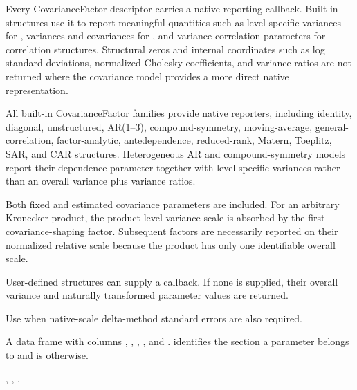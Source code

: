 \documentclass[a4paper]{book}
\begin{document}
\begin{Details}\relax
Every CovarianceFactor descriptor carries a native reporting callback. Built-in
structures use it to report meaningful quantities such as level-specific
variances for , variances and covariances for , and
variance-correlation parameters for correlation structures. Structural zeros
and internal coordinates such as log standard deviations, normalized Cholesky
coefficients, and variance ratios are not returned where the covariance model
provides a more direct native representation.

All built-in CovarianceFactor families provide native reporters, including
identity, diagonal, unstructured, AR(1--3), compound-symmetry, moving-average,
general-correlation, factor-analytic, antedependence, reduced-rank, Matern,
Toeplitz, SAR, and CAR structures. Heterogeneous AR and compound-symmetry
models report their dependence parameter together with level-specific
variances rather than an overall variance plus variance ratios.

Both fixed and estimated covariance parameters are included. For an arbitrary
Kronecker product, the product-level variance scale is absorbed by the first
covariance-shaping factor. Subsequent factors are necessarily reported on their
normalized relative scale because the product has only one identifiable overall
scale.

User-defined  structures can supply a 
callback. If none is supplied, their overall variance and naturally transformed
parameter values are returned.

Use  when native-scale delta-method standard errors
are also required.
\end{Details}
%
\begin{Value}
A data frame with columns , , ,
, and .  identifies the
 section a parameter belongs to and is  otherwise.
\end{Value}
%
\begin{SeeAlso}\relax
{}, , ,
\end{SeeAlso}
%
\begin{Examples}
\end{Examples}
\end{document}
